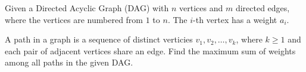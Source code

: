 Given a Directed Acyclic Graph (DAG) with $n$ vertices and $m$ directed edges,
where the vertices are numbered from $1$ to $n$.
The $i$-th vertex has a weight $a_i$.

A path in a graph is a sequence of distinct verticies $v_1,v_2,\ldots,v_k$,
where $k \geq 1$ and each pair of adjacent vertices share an edge.
Find the maximum sum of weights among all paths in the given DAG.
